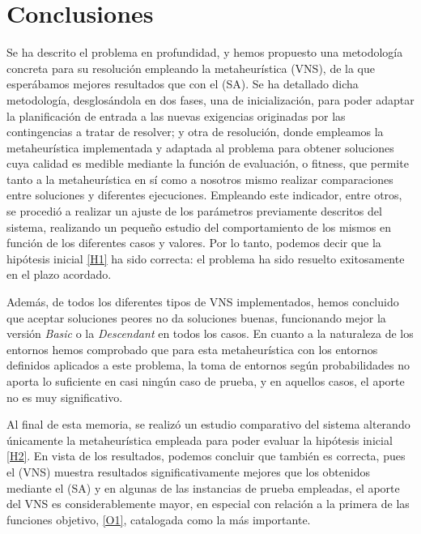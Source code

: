 \graphicspath{{capitulos/Capitulo6-Conclusiones/recursos/}}


\section{Conclusiones} \label{capitulo:6}

Se ha descrito el problema en profundidad, y hemos propuesto una metodología concreta para su resolución empleando la metaheurística \vns{} (VNS), de la que esperábamos mejores resultados que con el \sa{} (SA). Se ha detallado dicha metodología, desglosándola en dos fases, una de inicialización, para poder adaptar la planificación de entrada a las nuevas exigencias originadas por las contingencias a tratar de resolver; y otra de resolución, donde empleamos la metaheurística implementada y adaptada al problema para obtener soluciones cuya calidad es medible mediante la función de evaluación, o fitness, que permite tanto a la metaheurística en sí como a nosotros mismo realizar comparaciones entre soluciones y diferentes ejecuciones. Empleando este indicador, entre otros, se procedió a realizar un ajuste de los parámetros previamente descritos del sistema, realizando un pequeño estudio del comportamiento de los mismos en función de los diferentes casos y valores. Por lo tanto, podemos decir que la hipótesis inicial \ref{H1} ha sido correcta: el problema ha sido resuelto exitosamente en el plazo acordado.

Además, de todos los diferentes tipos de VNS implementados, hemos concluido que aceptar soluciones peores no da soluciones buenas, funcionando mejor la versión \textit{Basic} o la \textit{Descendant} en todos los casos. En cuanto a la naturaleza de los entornos hemos comprobado que para esta metaheurística con los entornos definidos aplicados a este problema, la toma de entornos según probabilidades no aporta lo suficiente en casi ningún caso de prueba, y en aquellos casos, el aporte no es muy significativo.

Al final de esta memoria, se realizó un estudio comparativo del sistema alterando únicamente la metaheurística empleada para poder evaluar la hipótesis inicial \ref{H2}. En vista de los resultados, podemos concluir que también es correcta, pues el \vns{} (VNS) muestra resultados significativamente mejores que los obtenidos mediante el \sa{} (SA) y en algunas de las instancias de prueba empleadas, el aporte del VNS es considerablemente mayor, en especial con relación a la primera de las funciones objetivo, \ref{O1}, catalogada como la más importante.

